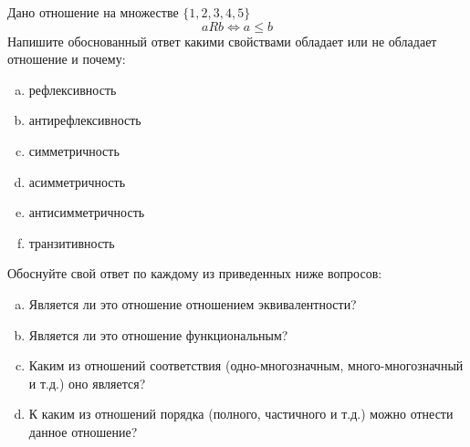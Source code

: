 \question
Дано отношение на множестве $\{1, 2, 3, 4, 5\}$ 
\begin{equation*}
aRb \iff a \leq b
\end{equation*}
Напишите обоснованный ответ какими свойствами обладает или не обладает отношение и почему:   
\begin{enumerate} [a)]\setcounter{enumi}{0}
\item рефлексивность
\item антирефлексивность
\item симметричность
\item асимметричность
\item антисимметричность
\item транзитивность
\end{enumerate}

Обоснуйте свой ответ по каждому из приведенных ниже вопросов:
\begin{enumerate} [a)]\setcounter{enumi}{0}
    \item Является ли это отношение отношением эквивалентности?
    \item Является ли это отношение функциональным?
    \item Каким из отношений соответствия (одно-многозначным, много-многозначный и т.д.) оно является?
    \item К каким из отношений порядка (полного, частичного и т.д.) можно отнести данное отношение?
\end{enumerate}



